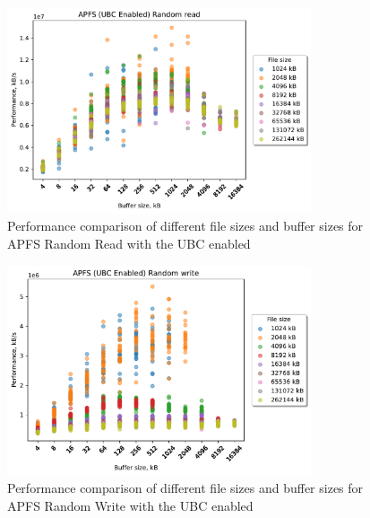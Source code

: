 \begin{figure}[!htb]
	\label{fig:bench_apfs_no_ubc_scatter_rnd_read}
	\begin{center}
		\includegraphics[width=0.8\textwidth]{figures.nosync/benchmarking/APFS/scatter-UBC Enabled-Random read.pdf}
	\end{center}
	\caption[Comparison of Random Read performance for file size and buffer size of APFS with the UBC disabled]{Performance comparison of different file sizes and buffer sizes for APFS Random Read with the UBC enabled}
\end{figure}
\begin{figure}[!htb]
	\label{fig:bench_apfs_no_ubc_scatter_rnd_write}
	\begin{center}
		\includegraphics[width=0.8\textwidth]{figures.nosync/benchmarking/APFS/scatter-UBC Enabled-Random write.pdf}
	\end{center}
	\caption[Comparison of Random Write performance for file size and buffer size of APFS with the UBC disabled]{Performance comparison of different file sizes and buffer sizes for APFS Random Write with the UBC enabled}
\end{figure}
\clearpage

